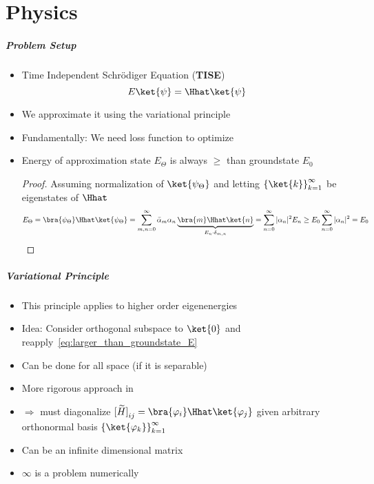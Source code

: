 \part[Part slide]{Physics}
\makepart%

\begin{frame}[t,label=intro]
    \frametitle{Problem Setup}
    \begin{itemize}[<+->]
        \setlength\itemsep{.5em}
        \item Time Independent Schrödiger Equation (\textbf{TISE}) 
        \[ E\ket{\psi} = \Hhat\ket{\psi}\]
        \item We approximate it using the variational principle~~\cite{libretexts_2022}
        \item Fundamentally: We need loss function to optimize
        \item Energy of approximation state $E_\Theta$ is always $\geq$ than groundstate $E_0$
        \begin{proof}
            Assuming normalization of $\ket{\psi_{\Theta}}$ and letting ${\{\ket{k}\}}_{k=1}^\infty$ be eigenstates of $\Hhat$
            \begin{equation}
                E_\Theta = \bra{\psi_{\Theta}}\Hhat\ket{\psi_{\Theta}} = 
                \sum_{m, n = 0}^\infty \bar{\alpha}_m \alpha_n 
                \underbrace{\bra{m}\Hhat\ket{n}}_{E_n\cdot \delta_{m,n}}
                = \sum_{n=0}^\infty |\alpha_n|^2 E_n \geq E_0 \sum_{n=0}^\infty |\alpha_n|^2  = E_0
                \label{eq:larger_than_groundstate_E}
            \end{equation}
        \end{proof}
    \end{itemize}
\end{frame}

\begin{frame}
    \frametitle{Variational Principle}
    \begin{itemize}[<+->]
        \setlength\itemsep{0.9em}
        \item This principle applies to higher order eigenenergies
        \item Idea: Consider orthogonal subspace to $\ket{0}$ and reapply~\eqref{eq:larger_than_groundstate_E}
        \item Can be done for all space (if it is separable)
        \item More rigorous approach in~\cite{libretexts_2022}
        \item $\Rightarrow$ must diagonalize ${[\widetilde{H}]}_{ij}=\bra{\varphi_i}\Hhat\ket{\varphi_j}$
                given arbitrary orthonormal basis ${\{\ket{\varphi_k}\}}_{k=1}^\infty$
        \item Can be an infinite dimensional matrix
        \item $\infty$ is a problem numerically
    \end{itemize}
\end{frame}

